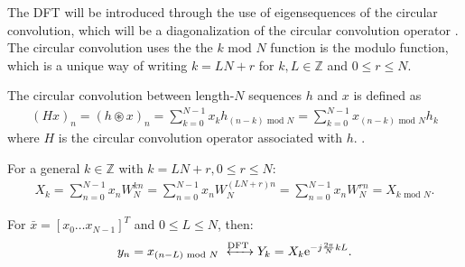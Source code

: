 The DFT will be introduced through the use of eigensequences of the circular convolution, which will be a diagonalization of the circular convolution operator \cite{FSP}. The circular convolution uses the the $k \text{ mod } N$ function is the modulo function, which is a unique way of writing $k = LN + r$ for $k,L \in \mathbb{Z}$ and $0\leq r \leq N$.

\begin{definition}
 	The circular convolution between length-$N$ sequences $h$ and $x$ is defined as
\begin{align*}
	(Hx)_n = (h \circledast x)_n = \sum_{k = 0}^{N-1} x_k h_{(n-k) \text{ mod } N} =\sum_{k = 0}^{N-1} x_{(n-k) \text{ mod } N} h_k
\end{align*}
where $H$ is the circular convolution operator associated with $h$. .
\end{definition}

For a general $k\in\mathbb{Z}$ with $k = LN + r, 0 \leq r \leq N$:
\begin{align*}
X_k = \sum_{n=0}^{N-1} x_n W_N^{kn} = \sum_{n=0}^{N-1} x_n W_N^{(LN+r)n} = \sum_{n=0}^{N-1} x_n W_N^{rn} = X_{k \text{ mod } N}.
\end{align*}

\begin{lemma}
For $\bar{x} = [x_0 \dots x_{N-1}]^T$ and $0 \leq L \leq N$, then:
\begin{align*}
y_n  = x_{(n-L) \text{ mod } N} \xleftrightarrow{\text{DFT}} Y_k = X_k \text{e}^{-j\frac{2\pi}{N} kL}.
\end{align*}
\end{lemma}

